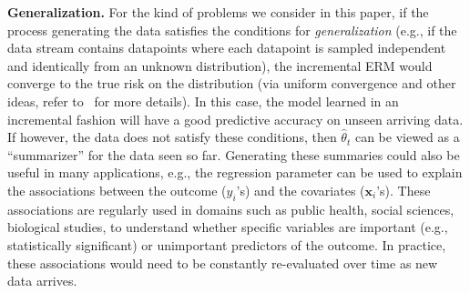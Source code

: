 \documentclass{article}
\theoremstyle{plain}
\def \polylog{\mbox{\rm polylog}}
\def \z {\mathbf z}
\def \CCC {\mathcal{C}}
\def \x {\mathbf x}
\begin{document}



\smallskip
\noindent\textbf{Generalization.} For the kind of problems we consider in this paper, if the process generating the data satisfies the conditions for {\em generalization} (e.g., if the data stream contains datapoints where each datapoint is sampled independent and identically from an unknown distribution), the incremental ERM would converge to the true risk on the distribution (via uniform convergence and other ideas, refer to~\cite{vapnik2013nature,shalev2010learnability,bassily2014differentially} for more details). In this case, the model learned in an incremental fashion will have a good predictive accuracy on unseen arriving data. If however, the data does not satisfy these conditions, then $\hat{\theta}_t$ can be viewed as a ``summarizer'' for the data seen so far. Generating these summaries could also be useful in many applications, e.g., the regression parameter can be used to explain the associations between the outcome ($y_i$'s) and the covariates ($\x_i$'s). These associations are regularly used in domains such as public health, social sciences, biological studies, to understand whether specific variables are important (e.g., statistically significant) or unimportant predictors of the outcome. In practice, these associations would need to be constantly re-evaluated over time as new data arrives. 
\end{document}
